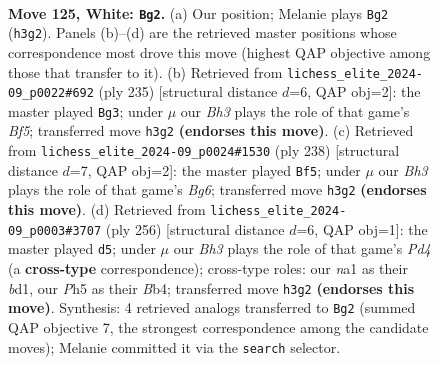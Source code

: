\documentclass[11pt]{article}
\begin{document}
\clearpage

\begin{figure}[p]\centering
\begin{subfigure}{0.46\textwidth}\centering
\resizebox{\linewidth}{!}{%
\newchessgame
\chessboard[
  setfen={8/5k2/8/6PP/8/7B/7K/n7 w - - 19 125},
  showmover=false,
  pgfstyle=straightmove, color=movearrow, markmove={h3-g2}
]}
\caption{}
\end{subfigure}\hfill
\begin{subfigure}{0.46\textwidth}\centering
\resizebox{\linewidth}{!}{%
\newchessgame
\chessboard[
  setfen={8/8/8/8/5b2/5k1p/8/6K1 b - - 7 118},
  showmover=false,
  pgfstyle=straightmove, color=movearrow, markmove={f4-g3}
]}
\caption{}
\end{subfigure}
\\[4pt]
\begin{subfigure}{0.46\textwidth}\centering
\resizebox{\linewidth}{!}{%
\newchessgame
\chessboard[
  setfen={6k1/8/5KBP/8/8/8/8/8 w - - 5 120},
  showmover=false,
  pgfstyle=straightmove, color=movearrow, markmove={g6-f5}
]}
\caption{}
\end{subfigure}\hfill
\begin{subfigure}{0.46\textwidth}\centering
\resizebox{\linewidth}{!}{%
\newchessgame
\chessboard[
  setfen={8/5k2/2K5/6P1/1B1P4/8/8/3b4 w - - 1 129},
  showmover=false,
  pgfstyle=straightmove, color=movearrow, markmove={d4-d5}
]}
\caption{}
\end{subfigure}
\caption{\textbf{Move 125, White: \texttt{Bg2}.} (a) Our position; Melanie plays \texttt{Bg2} (\texttt{h3g2}). Panels (b)--(d) are the retrieved master positions whose correspondence most drove this move (highest QAP objective among those that transfer to it). (b) Retrieved from \texttt{lichess\_elite\_2024-09\_p0022\#692} (ply 235) [structural distance $d$=6, QAP obj=2]: the master played \texttt{Bg3}; under $\mu$ our \emph{Bh3} plays the role of that game's \emph{Bf5}; transferred move \texttt{h3g2} \textbf{(endorses this move)}. (c) Retrieved from \texttt{lichess\_elite\_2024-09\_p0024\#1530} (ply 238) [structural distance $d$=7, QAP obj=2]: the master played \texttt{Bf5}; under $\mu$ our \emph{Bh3} plays the role of that game's \emph{Bg6}; transferred move \texttt{h3g2} \textbf{(endorses this move)}. (d) Retrieved from \texttt{lichess\_elite\_2024-09\_p0003\#3707} (ply 256) [structural distance $d$=6, QAP obj=1]: the master played \texttt{d5}; under $\mu$ our \emph{Bh3} plays the role of that game's \emph{Pd4} (a \textbf{cross-type} correspondence); cross-type roles: our \emph{n}a1 as their \emph{b}d1, our \emph{P}h5 as their \emph{B}b4; transferred move \texttt{h3g2} \textbf{(endorses this move)}. Synthesis: 4 retrieved analogs transferred to \texttt{Bg2} (summed QAP objective 7, the strongest correspondence among the candidate moves); Melanie committed it via the \texttt{search} selector.}
\label{fig:thought-m248}
\end{figure}
\end{document}
